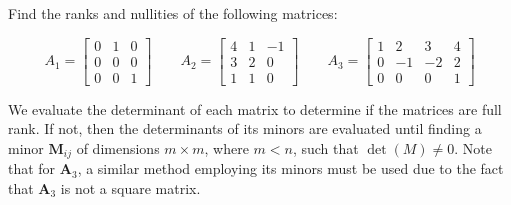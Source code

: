 \item [3.5] Find the ranks and nullities of the following matrices:

\begin{equation*}
 A_1 = \begin{bmatrix}
      0 & 1 & 0\\
      0 & 0 & 0\\
      0 & 0 & 1
     \end{bmatrix}
\qquad
A_2 =  \begin{bmatrix}
      4 & 1 & -1\\
      3 & 2 & 0\\
      1 & 1 & 0
     \end{bmatrix}
\qquad
A_3 = \begin{bmatrix}
      1 & 2 & 3 & 4\\
      0 & -1 & -2 & 2\\
      0 & 0 & 0 & 1
     \end{bmatrix}
\end{equation*}

We evaluate the determinant of each matrix to determine
if the matrices are full rank.
If not, then the determinants of its minors are
evaluated until finding a minor $\mathbf{M}_{ij}$ of dimensions $m \times m$,
where $m < n$, such that $\det(M) \neq 0$.
Note that for $\mathbf{A}_3$, a similar method employing
its minors must be used due to the fact that $\mathbf{A}_3$
is not a square matrix.

